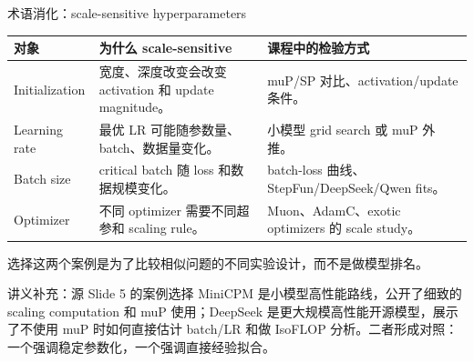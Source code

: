 \begin{importantbox}{术语消化：scale-sensitive hyperparameters}
\begin{tabular}{L{0.24\textwidth}L{0.34\textwidth}L{0.32\textwidth}}
\toprule
对象 & 为什么 scale-sensitive & 课程中的检验方式 \\
\midrule
Initialization & 宽度、深度改变会改变 activation 和 update magnitude。 & muP/SP 对比、activation/update 条件。 \\
Learning rate & 最优 LR 可能随参数量、batch、数据量变化。 & 小模型 grid search 或 muP 外推。 \\
Batch size & critical batch 随 loss 和数据规模变化。 & batch-loss 曲线、StepFun/DeepSeek/Qwen fits。 \\
Optimizer & 不同 optimizer 需要不同超参和 scaling rule。 & Muon、AdamC、exotic optimizers 的 scale study。 \\
\bottomrule
\end{tabular}
\end{importantbox}


选择这两个案例是为了比较相似问题的不同实验设计，而不是做模型排名。
\begin{knowledgebox}{讲义补充：源 Slide 5 的案例选择}
MiniCPM 是小模型高性能路线，公开了细致的 scaling computation 和 muP 使用；DeepSeek 是更大规模高性能开源模型，展示了不使用 muP 时如何直接估计 batch/LR 和做 IsoFLOP 分析。二者形成对照：一个强调稳定参数化，一个强调直接经验拟合。
\end{knowledgebox}

